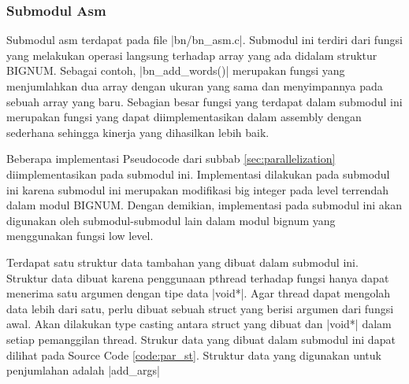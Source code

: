 \subsubsection{Submodul Asm} \label{sec:bn_asm}
  Submodul asm terdapat pada file |bn/bn_asm.c|. Submodul ini terdiri dari fungsi yang melakukan operasi langsung terhadap array yang ada didalam struktur BIGNUM. Sebagai contoh, |bn_add_words()| merupakan fungsi yang menjumlahkan dua array dengan ukuran yang sama dan menyimpannya pada sebuah array yang baru. Sebagian besar fungsi yang terdapat dalam submodul ini merupakan fungsi yang dapat diimplementasikan dalam assembly dengan sederhana sehingga kinerja yang dihasilkan lebih baik.

  Beberapa implementasi Pseudocode dari subbab \ref{sec:parallelization} diimplementasikan pada submodul ini. Implementasi dilakukan pada submodul ini karena submodul ini merupakan modifikasi big integer pada level terrendah dalam modul BIGNUM. Dengan demikian, implementasi pada submodul ini akan digunakan oleh submodul-submodul lain dalam modul bignum yang menggunakan fungsi low level.

  Terdapat satu struktur data tambahan yang dibuat dalam submodul ini. Struktur data dibuat karena penggunaan pthread terhadap fungsi hanya dapat menerima satu argumen dengan tipe data |void*|. Agar thread dapat mengolah data lebih dari satu, perlu dibuat sebuah struct yang berisi argumen dari fungsi awal. Akan dilakukan type casting antara struct yang dibuat dan |void*| dalam setiap pemanggilan thread. Strukur data yang dibuat dalam submodul ini dapat dilihat pada Source Code \ref{code:par_st}. Struktur data yang digunakan untuk penjumlahan adalah |add_args|

